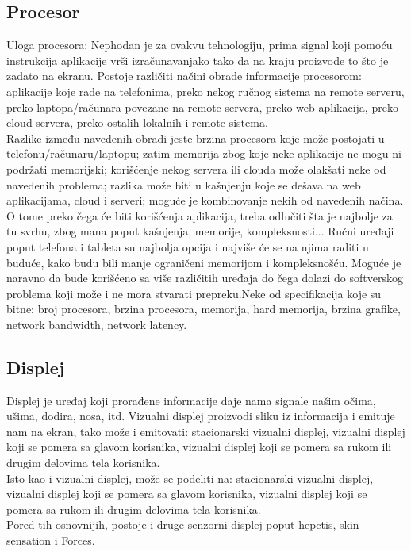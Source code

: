\documentclass[a4paper]{article}
\begin{document}
	\subsection{Procesor}
    \label{sec:Procesor}
    Uloga procesora: Nephodan je za ovakvu tehnologiju, prima signal koji pomoću instrukcija aplikacije vrši izračunavanjako tako da na kraju proizvode to što je zadato na ekranu. Postoje različiti načini obrade informacije procesorom: aplikacije koje rade na telefonima, preko nekog ručnog sistema na remote serveru, preko laptopa/računara povezane na remote servera, preko web aplikacija, preko cloud servera, preko ostalih lokalnih i remote sistema.\\
	Razlike između navedenih obradi jeste brzina procesora koje može postojati u telefonu/računaru/laptopu; zatim memorija zbog koje neke aplikacije ne mogu ni podržati memorijski; korišćenje nekog servera ili clouda može olakšati neke od navedenih problema; razlika može biti u kašnjenju koje se dešava na web aplikacijama, cloud i serveri; moguće je kombinovanje nekih od navedenih načina. \\
	O tome preko čega će biti korišćenja aplikacija, treba odlučiti šta je najbolje za tu svrhu, zbog mana poput kašnjenja, memorije, kompleksnosti... Ručni uređaji poput telefona i tableta su najbolja opcija i najviše će se na njima raditi u buduće, kako budu bili manje ograničeni memorijom i kompleksnošću. Moguće je naravno da bude korišćeno sa više različitih uređaja do čega dolazi do softverskog problema koji može i ne mora stvarati prepreku.Neke od specifikacija koje su bitne: broj procesora, brzina procesora, memorija, hard memorija, brzina grafike, network bandwidth, network latency.\\
	\subsection{Displej}
    \label{sec:Displej}
	Displej je uređaj koji prorađene informacije daje nama signale našim očima, ušima, dodira, nosa, itd. Vizualni displej proizvodi sliku iz informacija i emituje nam na ekran, tako može i emitovati:  stacionarski vizualni displej, vizualni displej koji se pomera sa glavom korisnika, vizualni displej koji se pomera sa rukom ili drugim delovima tela korisnika.\\
	Isto kao i vizualni displej, može se podeliti na: stacionarski vizualni displej, vizualni displej koji se pomera sa glavom korisnika, vizualni displej koji se pomera sa rukom ili drugim delovima tela korisnika. \\
	Pored tih osnovnijih, postoje i druge senzorni displej poput hepctis, skin sensation i Forces.\\
\end{document}

